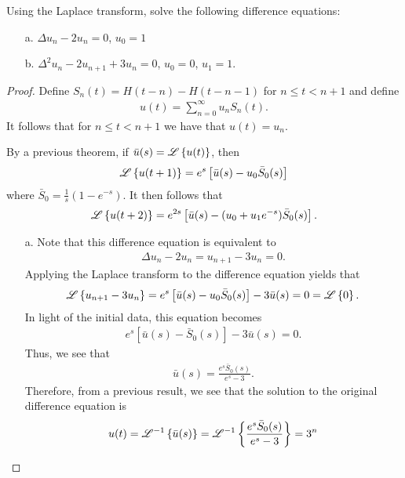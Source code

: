 \begin{problem}{4.35}
  Using the Laplace transform, solve the following difference equations:
  \begin{enumerate}
    \item[a.] $\Delta u_n - 2 u_n = 0$, $u_0 = 1$
    \item[b.] $\Delta^2 u_n - 2 u_{n+1} + 3 u_n =0$, $u_0 = 0$, $u_1 = 1$.
  \end{enumerate}
\end{problem}

\begin{proof}
  Define $S_n(t) = H(t-n) - H(t-n-1)$ for $n \leq t < n+1$ and define
  \begin{align*}
    u(t) = \sum_{n=0}^\infty u_n S_n(t).
  \end{align*}
  It follows that for $n \leq t < n+1$ we have that $u(t) = u_n$.

  By a previous theorem, if $\bar{u}(s) = \mathscr{L}\left\{ {u(t)} \right\}$, then
  \begin{align*}
    \mathscr{L}\left\{ {u(t+1)} \right\} = e^s\left[\bar{u}(s)-u_0 \bar{S}_0(s)\right]
  \end{align*}
  where $\bar{S}_0 = \frac{1}{s}\left(1-e^{-s}\right)$. It then follows that
  \begin{align*}
    \mathscr{L}\left\{ {u(t+2)} \right\} = e^{2s}\left[\bar{u}(s)-(u_0 + u_1e^{-s})\bar{S}_0(s)\right].
  \end{align*}

  \begin{enumerate}
    \item[a.] Note that this difference equation is equivalent to
      \begin{align*}
        \Delta u_n - 2 u_n  = u_{n+1} - 3 u_{n} = 0.
      \end{align*}
      Applying the Laplace transform to the difference equation yields that
      \begin{align*}
        \mathscr{L}\left\{ {u_{n+1} - 3 u_n} \right\} = e^s\left[\bar{u}(s)-u_0 \bar{S}_0(s)\right] - 3\bar{u}(s) = 0 = \mathscr{L}\left\{ {0} \right\}.
      \end{align*}
      In light of the initial data, this equation becomes
      \begin{align*}
        e^s\left[\bar{u}(s)-\bar{S}_0(s)\right] - 3\bar{u}(s) = 0.
      \end{align*}
      Thus, we see that
      \begin{align*}
        \bar{u}(s) = \frac{e^{s}\bar{S}_0(s)}{e^s-3}.
      \end{align*}
      Therefore, from a previous result, we see that the solution to the original
      difference equation is
      \begin{align*}
        u(t) = \mathscr{L}^{-1}\left\{ {\bar{u}(s)} \right\} = \mathscr{L}^{-1}\left\{ {\frac{e^{s}\bar{S}_0(s)}{e^s-3}} \right\} = 3^n
      \end{align*}


\end{enumerate}
\end{proof}
